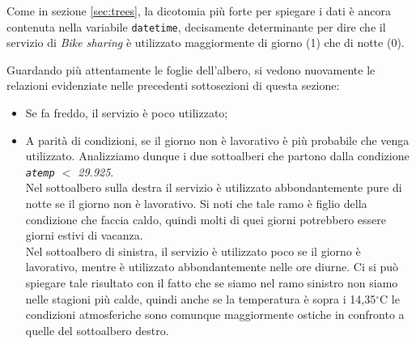 Come in sezione \ref{sec:trees}, la dicotomia più forte per spiegare i dati è
ancora contenuta nella variabile \texttt{datetime}, decisamente determinante
per dire che il servizio di \emph{Bike sharing} è utilizzato maggiormente di
giorno (1) che di notte (0).

Guardando più attentamente le foglie dell'albero, si vedono nuovamente le
relazioni evidenziate nelle precedenti sottosezioni di questa sezione:

\begin{itemize}
\item Se fa freddo, il servizio è poco utilizzato;
\item A parità di condizioni, se il giorno non è lavorativo è più probabile
  che venga utilizzato. Analizziamo dunque i due sottoalberi che partono dalla
  condizione \emph{\texttt{atemp} $ < $ 29.925}. \\
  Nel sottoalbero sulla destra il servizio è utilizzato abbondantemente pure
  di notte se il giorno non è lavorativo. Si noti che tale ramo è figlio della
  condizione che faccia caldo, quindi molti di quei giorni potrebbero essere
  giorni estivi di vacanza. \\
  Nel sottoalbero di sinistra, il servizio è utilizzato poco se il giorno è
  lavorativo, mentre è utilizzato abbondantemente nelle ore diurne. Ci si può
  spiegare tale risultato con il fatto che se siamo nel ramo sinistro non
  siamo nelle stagioni più calde, quindi anche se la temperatura è sopra i
  14,35$^{\circ}$C le condizioni atmosferiche sono comunque maggiormente
  ostiche in confronto a quelle del sottoalbero destro.
\end{itemize}
